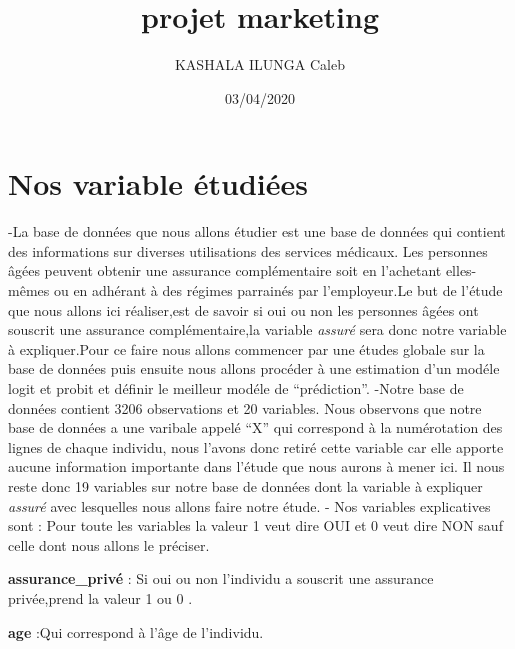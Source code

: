 \documentclass[
  14pt,
  french,
]{article}
\title{projet marketing}
\author{KASHALA ILUNGA Caleb}
\date{03/04/2020}
\begin{document}
\maketitle

{
\setcounter{tocdepth}{2}
\tableofcontents
}
\newpage

\hypertarget{nos-variable-uxe9tudiuxe9es}{%
\section{Nos variable étudiées}\label{nos-variable-uxe9tudiuxe9es}}

-La base de données que nous allons étudier est une base de données qui
contient des informations sur diverses utilisations des services
médicaux. Les personnes âgées peuvent obtenir une assurance
complémentaire soit en l'achetant elles-mêmes ou en adhérant à des
régimes parrainés par l'employeur.Le but de l'étude que nous allons ici
réaliser,est de savoir si oui ou non les personnes âgées ont souscrit
une assurance complémentaire,la variable \emph{assuré} sera donc notre
variable à expliquer.Pour ce faire nous allons commencer par une études
globale sur la base de données puis ensuite nous allons procéder à une
estimation d'un modéle logit et probit et définir le meilleur modéle de
``prédiction''. \linebreak -Notre base de données contient 3206
observations et 20 variables. \linebreak Nous observons que notre base
de données a une varibale appelé ``X'' qui correspond à la numérotation
des lignes de chaque individu, nous l'avons donc retiré cette variable
car elle apporte aucune information importante dans l'étude que nous
aurons à mener ici. \linebreak Il nous reste donc 19 variables sur notre
base de données dont la variable à expliquer \emph{assuré} avec
lesquelles nous allons faire notre étude. - Nos variables explicatives
sont : \linebreak Pour toute les variables la valeur 1 veut dire OUI et
0 veut dire NON sauf celle dont nous allons le préciser.\\
\linebreak

\textbf{assurance\_privé} : Si oui ou non l'individu a souscrit une
assurance privée,prend la valeur 1 ou 0 .

\linebreak

\textbf{age} :Qui correspond à l'âge de l'individu.
\end{document}
